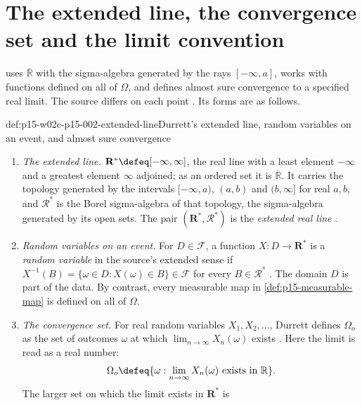 \section{The extended line, the convergence set and the limit convention}
\label{sec:p15-w02c-p15-002-extended}

 uses \(\overline{\mathbb R}\)
with the sigma-algebra generated by the rays \([-\infty,a]\), works with
functions defined on all of \(\Omega\), and defines almost sure
convergence to a specified real limit. The source differs on each point
\cite[pp.~16--17]{DurrettPTEAuthor2019}. Its forms are as follows.

\begin{hbdefinition}{def:p15-w02c-p15-002-extended-line}{Durrett's extended line, random variables on an event, and almost sure convergence}
\begin{enumerate}
\item \emph{The extended line.} \(\mathbf R^*\defeq[-\infty,\infty]\),
      the real line with a least element \(-\infty\) and a greatest
      element \(\infty\) adjoined; as an ordered set it is
      \(\overline{\mathbb R}\). It carries the topology generated by the
      intervals \([-\infty,a)\), \((a,b)\) and \((b,\infty]\) for real
      \(a,b\), and \(\mathcal R^*\) is the Borel sigma-algebra of that
      topology, the sigma-algebra generated by its open sets. The pair
      \((\mathbf R^*,\mathcal R^*)\) is the \emph{extended real line}
      \cite[p.~17]{DurrettPTEAuthor2019}.
\item \emph{Random variables on an event.} For \(D\in\mathcal F\), a
      function \(X:D\to\mathbf R^*\) is a \emph{random variable} in the
      source's extended sense if \(X^{-1}(B)=\{\omega\in D:X(\omega)\in
      B\}\in\mathcal F\) for every \(B\in\mathcal R^*\)
      \cite[p.~17]{DurrettPTEAuthor2019}. The domain \(D\) is part of the
      data. By contrast, every measurable map in
      \cref{def:p15-measurable-map} is defined on all of \(\Omega\).
\item \emph{The convergence set.} For real random variables
      \(X_1,X_2,\ldots\), Durrett defines
      \(\Omega_o\) as the set of outcomes \(\omega\) at which
      \(\lim_{n\to\infty}X_n(\omega)\) exists
      \cite[p.~16]{DurrettPTEAuthor2019}. Here the limit is read as a
      real number:
      \[
       \Omega_o\defeq\{\omega:\lim_{n\to\infty}X_n(\omega)
                        \text{ exists in }\mathbb R\}.
      \]
      The larger set on which the limit exists in \(\mathbf R^*\) is

\end{enumerate}
\end{hbdefinition}
